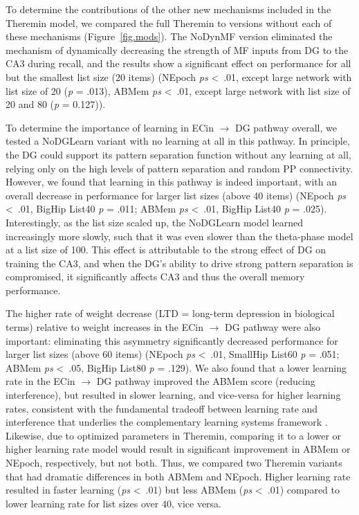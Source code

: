 \documentclass[11pt,twoside]{article}
\newif\myifpdf
\begin{document}
To determine the contributions of the other new mechanisms included in the Theremin model, we compared the full Theremin to versions without each of these mechanisms (Figure~\ref{fig.mods}).  The NoDynMF version eliminated the mechanism of dynamically decreasing the strength of MF inputs from DG to the CA3 during recall, and the results show a significant effect on performance for all but the smallest list size (20 items) (NEpoch \emph{ps} \textless \ .01, except large network with list size of 20 (\emph{p} = .013), ABMem \emph{ps} \textless \ .01, except large network with list size of 20 and 80 (\emph{p} = 0.127)). 

To determine the importance of learning in ECin $\rightarrow$ DG pathway overall, we tested a NoDGLearn variant with no learning at all in this pathway.  In principle, the DG could support its pattern separation function without any learning at all, relying only on the high levels of pattern separation and random PP connectivity.  However, we found that learning in this pathway is indeed important, with an overall decrease in performance for larger list sizes (above 40 items) (NEpoch \emph{ps} \textless \ .01, BigHip List40 \emph{p} = .011; ABMem \emph{ps} \textless \ .01, BigHip List40 \emph{p} = .025).  Interestingly, as the list size scaled up, the NoDGLearn model learned increasingly more slowly, such that it was even slower than the theta-phase model at a list size of 100. This effect is attributable to the strong effect of DG on training the CA3, and when the DG's ability to drive strong pattern separation is compromised, it significantly affects CA3 and thus the overall memory performance.

The higher rate of weight decrease (LTD = long-term depression in biological terms) relative to weight increases in the ECin $\rightarrow$ DG pathway were also important: eliminating this asymmetry significantly decreased performance for larger list sizes (above 60 items) (NEpoch \emph{ps} \textless \ .01, SmallHip List60 \emph{p} = .051; ABMem \emph{ps} \textless \ .05, BigHip List80 \emph{p} = .129).  We also found that a lower learning rate in the ECin $\rightarrow$ DG pathway improved the ABMem score (reducing interference), but resulted in slower learning, and vice-versa for higher learning rates, consistent with the fundamental tradeoff between learning rate and interference that underlies the complementary learning systems framework \citep{McClellandMcNaughtonOReilly95}.  Likewise, due to optimized parameters in Theremin, comparing it to a lower or higher learning rate model would result in significant improvement in ABMem or NEpoch, respectively, but not both. Thus, we compared two Theremin variants that had dramatic differences in both ABMem and NEpoch. Higher learning rate resulted in faster learning (\emph{ps} \textless \ .01) but less ABMem (\emph{ps} \textless \ .01) compared to lower learning rate for list sizes over 40, vice versa.
\end{document}
